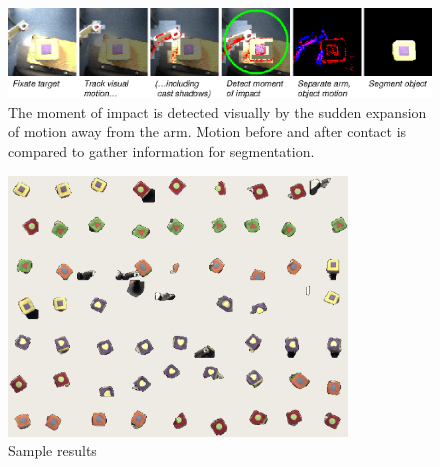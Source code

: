 
\begin{figure}[tbh]
  \begin{center}
\includegraphics[width=\columnwidth]{fig-poke-zoom.eps}
  \end{center}
  \caption{
    The moment of impact is detected visually by the
    sudden expansion of motion away from the arm.  Motion before and
    after contact is compared to gather information for segmentation.
}
\end{figure}



\begin{figure}[tbh]
  \centerline{\includegraphics[width=9cm]{experiment-montage}}
  \caption{Sample results}
  \label{fig:sample-results}
\end{figure}

